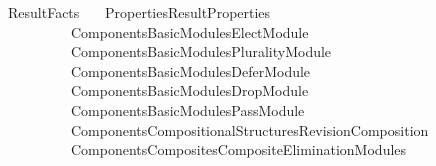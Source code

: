 %
\begin{isabellebody}%
%
%
\isadelimtheory
%
\endisadelimtheory
%
\isatagtheory
{}\isamarkupfalse%
\ Result{\isacharunderscore}{\kern0pt}Facts\isanewline
\ \ \ {\isachardoublequoteopen}{\isachardot}{\kern0pt}{\isachardot}{\kern0pt}{\isacharslash}{\kern0pt}Properties{\isacharslash}{\kern0pt}Result{\isacharunderscore}{\kern0pt}Properties{\isachardoublequoteclose}\isanewline
\ \ \ \ \ \ \ \ \ \ {\isachardoublequoteopen}{\isachardot}{\kern0pt}{\isachardot}{\kern0pt}{\isacharslash}{\kern0pt}Components{\isacharslash}{\kern0pt}Basic{\isacharunderscore}{\kern0pt}Modules{\isacharslash}{\kern0pt}Elect{\isacharunderscore}{\kern0pt}Module{\isachardoublequoteclose}\isanewline
\ \ \ \ \ \ \ \ \ \ {\isachardoublequoteopen}{\isachardot}{\kern0pt}{\isachardot}{\kern0pt}{\isacharslash}{\kern0pt}Components{\isacharslash}{\kern0pt}Basic{\isacharunderscore}{\kern0pt}Modules{\isacharslash}{\kern0pt}Plurality{\isacharunderscore}{\kern0pt}Module{\isachardoublequoteclose}\isanewline
\ \ \ \ \ \ \ \ \ \ {\isachardoublequoteopen}{\isachardot}{\kern0pt}{\isachardot}{\kern0pt}{\isacharslash}{\kern0pt}Components{\isacharslash}{\kern0pt}Basic{\isacharunderscore}{\kern0pt}Modules{\isacharslash}{\kern0pt}Defer{\isacharunderscore}{\kern0pt}Module{\isachardoublequoteclose}\isanewline
\ \ \ \ \ \ \ \ \ \ {\isachardoublequoteopen}{\isachardot}{\kern0pt}{\isachardot}{\kern0pt}{\isacharslash}{\kern0pt}Components{\isacharslash}{\kern0pt}Basic{\isacharunderscore}{\kern0pt}Modules{\isacharslash}{\kern0pt}Drop{\isacharunderscore}{\kern0pt}Module{\isachardoublequoteclose}\isanewline
\ \ \ \ \ \ \ \ \ \ {\isachardoublequoteopen}{\isachardot}{\kern0pt}{\isachardot}{\kern0pt}{\isacharslash}{\kern0pt}Components{\isacharslash}{\kern0pt}Basic{\isacharunderscore}{\kern0pt}Modules{\isacharslash}{\kern0pt}Pass{\isacharunderscore}{\kern0pt}Module{\isachardoublequoteclose}\isanewline
\ \ \ \ \ \ \ \ \ \ {\isachardoublequoteopen}{\isachardot}{\kern0pt}{\isachardot}{\kern0pt}{\isacharslash}{\kern0pt}Components{\isacharslash}{\kern0pt}Compositional{\isacharunderscore}{\kern0pt}Structures{\isacharslash}{\kern0pt}Revision{\isacharunderscore}{\kern0pt}Composition{\isachardoublequoteclose}\isanewline
\ \ \ \ \ \ \ \ \ \ {\isachardoublequoteopen}{\isachardot}{\kern0pt}{\isachardot}{\kern0pt}{\isacharslash}{\kern0pt}Components{\isacharslash}{\kern0pt}Composites{\isacharslash}{\kern0pt}Composite{\isacharunderscore}{\kern0pt}Elimination{\isacharunderscore}{\kern0pt}Modules{\isachardoublequoteclose}\isanewline

\end{isabellebody}
